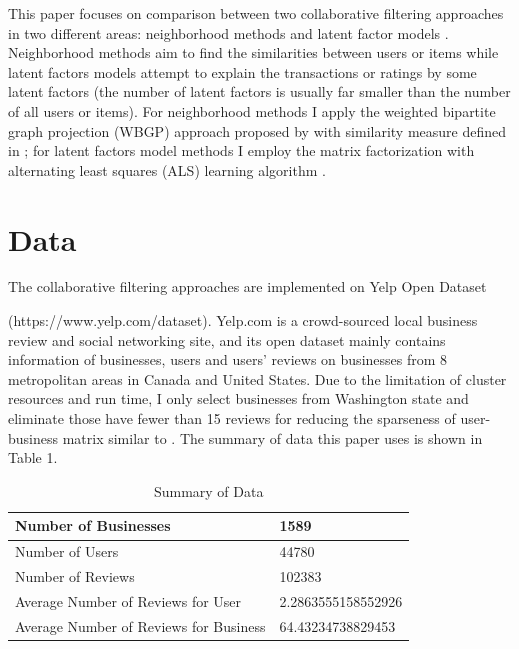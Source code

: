 \documentclass{article}
\begin{document}
\indent This paper focuses on comparison between two collaborative filtering approaches in two 
different areas: neighborhood methods and latent factor models \cite{koren2009matrix}. Neighborhood methods aim 
to find the similarities between users or items while latent factors models attempt to explain 
the transactions or ratings by some latent factors (the number of latent factors is usually far 
smaller than the number of all users or items). For neighborhood methods I apply the weighted bipartite 
graph projection (WBGP) approach proposed by \cite{zhou2007bipartite} with similarity measure defined in \cite{sawant2013collaborative} \cite{shang2008personal}; for latent factors 
model methods I employ the matrix factorization with alternating least squares (ALS) learning algorithm \cite{koren2009matrix}. 

\section*{Data} %


\noindent The collaborative filtering approaches are implemented on Yelp Open Dataset

\noindent (https://www.yelp.com/dataset). Yelp.com is a crowd-sourced local business review and 
social networking site, and its open dataset mainly contains information of businesses, users 
and users’ reviews on businesses from 8 metropolitan areas in Canada and United States. Due to 
the limitation of cluster resources and run time, I only select businesses from Washington state 
and eliminate those have fewer than 15 reviews for reducing the sparseness of user-business matrix 
similar to \cite{ting2013yelp}. The summary of data this paper uses is shown in Table 1.

\begin{table}[H]
\centering
\begin{tabular}{|l|l|} 
\hline
Number of Businesses                   & 1589                \\ 
\hline
Number of Users                        & 44780               \\ 
\hline
Number of Reviews                      & 102383              \\ 
\hline
Average Number of Reviews for User     & 2.2863555158552926  \\ 
\hline
Average Number of Reviews for Business & 64.43234738829453   \\
\hline
\end{tabular}
\caption{Summary of Data}
\label{table1}
\end{table}
\end{document}
